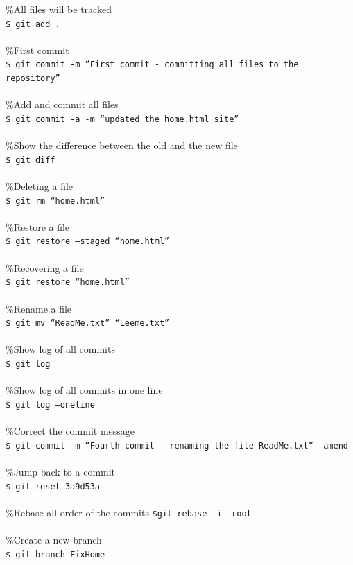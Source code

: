 \documentclass[10pt, a4paper,ngerman]{article}
\begin{document}
\%All files will be tracked\\
\texttt{\$ git add .}\\\\
\%First commit\\
\texttt{\$ git commit -m ``First commit - committing all files to the repository''}\\\\
\%Add and commit all files\\
\texttt{\$ git commit -a -m ``updated the home.html site''}\\\\
\%Show the difference between the old and the new file\\
\texttt{\$ git diff}\\\\
\%Deleting a file\\
\texttt{\$ git rm ``home.html''}\\\\
\%Restore a file\\
\texttt{\$ git restore --staged ``home.html''}\\\\
\%Recovering a file\\
\texttt{\$ git restore ``home.html''}\\\\
\%Rename a file\\
\texttt{\$ git mv ``ReadMe.txt'' ``Leeme.txt''}\\\\
\%Show log of all commits\\
\texttt{\$ git log}\\\\
\%Show log of all commits in one line\\
\texttt{\$ git log --oneline}\\\\
\%Correct the commit message\\
\texttt{\$ git commit -m ``Fourth commit - renaming the file ReadMe.txt'' --amend}\\\\
\%Jump back to a commit\\
\texttt{\$ git reset 3a9d53a}\\\\
\%Rebase all order of the commits
\texttt{\$git rebase -i --root}\\\\
\%Create a new branch\\
\texttt{\$ git branch FixHome}\\\\
\end{document}
